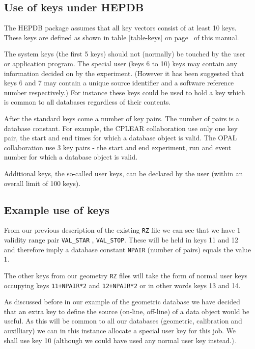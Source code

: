 \subsection{Use of keys under HEPDB}
The HEPDB package assumes that all key vectors consist of at
least 10 keys. These keys are defined as shown in table
\ref{table-keys} on page~\pageref{table-keys} of this manual.
\par
The system keys (the first 5 keys) should not (normally) be touched by the user or application program.
The special user (keys 6 to 10) keys may contain any information decided on by the experiment.
(However it has been suggested that keys 6 and 7 may contain a unique source identifier and
a software reference number respectively.)
For instance these keys could be used to hold a key which is common to all databases regardless
of their contents.
\par
After the standard keys come a number of key pairs. The number of pairs
is a database constant. For example, the CPLEAR collaboration use only
one key pair, the start and end times for which a database object is
valid. The OPAL collaboration use 3 key pairs - the start and end
experiment, run and event number for which a database object is valid.
\par
Additional keys, the so-called user keys, can be declared by the user
(within an overall limit of 100 keys).
%
%
%
\subsection{Example use of keys}
From our previous description of the existing {\tt RZ} file we can see that we
have 1 validity range pair {\tt VAL\_STAR} , {\tt VAL\_STOP}. These will be held
in keys 11 and 12 and therefore imply a database constant {\tt NPAIR} (number of
pairs) equals the value 1.
\par
The other keys from our geometry {\tt RZ} files will take the form of normal user
keys occupying keys {\tt 11+NPAIR*2} and {\tt 12+NPAIR*2} or in other words
keys 13 and 14.
\par
As discussed before in our example of the geometric database we have decided
that an extra key to define the source (on-line, off-line) of a data object
would be useful. As this will be common to all our databases (geometric,
calibration and auxilliary) we can in this instance allocate a special user
key for this job. We shall use key 10 (although we could have used any normal
user key instead.).
%
